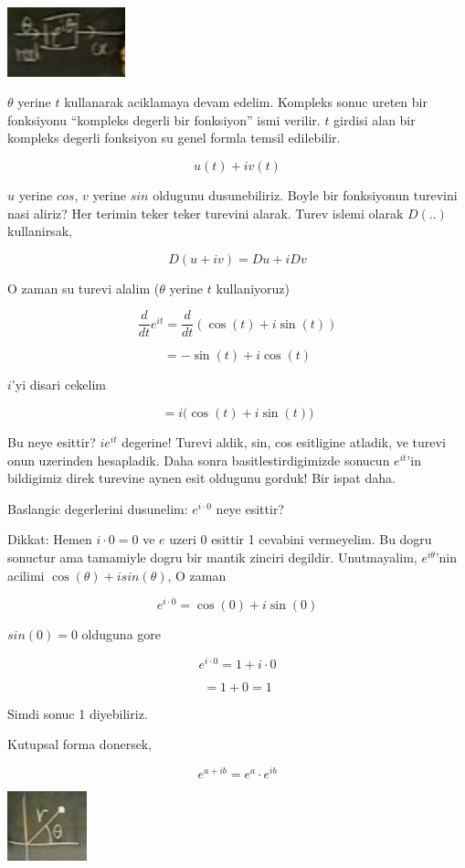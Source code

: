 \documentclass[12pt,fleqn]{article}\usepackage{../common}
\begin{document}
\includegraphics[height=2cm]{6_3.png}

$\theta$ yerine $t$ kullanarak aciklamaya devam edelim. Kompleks sonuc
ureten bir fonksiyonu ``kompleks degerli bir fonksiyon'' ismi verilir. $t$
girdisi alan bir kompleks degerli fonksiyon su genel formla temsil
edilebilir. 

\[ u(t) + iv(t) \]

$u$ yerine $cos$, $v$ yerine $sin$ oldugunu dusunebiliriz. Boyle bir
fonksiyonun turevini nasi aliriz? Her terimin teker teker turevini
alarak. Turev islemi olarak $D(..)$ kullanirsak,

\[ D(u+iv) = Du + iDv \]

O zaman su turevi alalim ($\theta$ yerine $t$ kullaniyoruz) 

\[ \frac{d}{dt}e^{it} = \frac{d}{dt}(\cos(t) + i\sin(t)) \]

\[ = -\sin(t) + i\cos(t) \]

$i$'yi disari cekelim

\[ = i \bigg( \cos(t) + i\sin(t) \bigg) \]

Bu neye esittir? $ie^{it}$ degerine! Turevi aldik, sin, cos esitligine
atladik, ve turevi onun uzerinden hesapladik. Daha sonra
basitlestirdigimizde sonucun $e^{it}$'in bildigimiz direk turevine aynen
esit oldugunu gorduk! Bir ispat daha. 

Baslangic degerlerini dusunelim: $e^{i\cdot 0}$ neye esittir? 

Dikkat: Hemen $i \cdot 0 = 0$ ve $e$ uzeri $0$ esittir 1 cevabini
vermeyelim. Bu dogru sonuctur ama tamamiyle dogru bir mantik zinciri
degildir. Unutmayalim, $e^{i\theta}$'nin acilimi $\cos(\theta) +
isin(\theta)$, O zaman

\[ e^{i \cdot 0} = \cos(0) + i\sin(0) \]

$sin(0) = 0$ olduguna gore

\[ e^{i \cdot 0} = 1 + i \cdot 0 \]

\[ = 1 +  0  = 1\]

Simdi sonuc 1 diyebiliriz.

Kutupsal forma donersek, 

\[ e^{a+ib}  = e^a \cdot e^{ib}\]

\includegraphics[height=2cm]{6_4.png}
\end{document}
